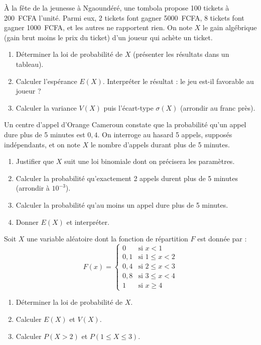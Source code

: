 \documentclass[11pt]{article}
\begin{document}
\begin{exercice}
À la fête de la jeunesse à Ngaoundéré, une tombola propose 100 tickets à \SI{200}{FCFA} l'unité. Parmi eux, 2 tickets font gagner \SI{5000}{FCFA}, 8 tickets font gagner \SI{1000}{FCFA}, et les autres ne rapportent rien. On note $X$ le gain algébrique (gain brut moins le prix du ticket) d'un joueur qui achète un ticket.
\begin{enumerate}
\item Déterminer la loi de probabilité de $X$ (présenter les résultats dans un tableau).
\item Calculer l'espérance $E(X)$. Interpréter le résultat : le jeu est-il favorable au joueur ?
\item Calculer la variance $V(X)$ puis l'écart-type $\sigma(X)$ (arrondir au franc près).
\end{enumerate}
\end{exercice}

\begin{exercice}
Un centre d'appel d'Orange Cameroun constate que la probabilité qu'un appel dure plus de 5 minutes est $0{,}4$. On interroge au hasard 5 appels, supposés indépendants, et on note $X$ le nombre d'appels durant plus de 5 minutes.
\begin{enumerate}
\item Justifier que $X$ suit une loi binomiale dont on précisera les paramètres.
\item Calculer la probabilité qu'exactement 2 appels durent plus de 5 minutes (arrondir à $10^{-3}$).
\item Calculer la probabilité qu'au moins un appel dure plus de 5 minutes.
\item Donner $E(X)$ et interpréter.
\end{enumerate}
\end{exercice}

\begin{exercice}
Soit $X$ une variable aléatoire dont la fonction de répartition $F$ est donnée par :
\[
F(x)=
\begin{cases}
0 & \text{si } x<1\\
0{,}1 & \text{si } 1\le x<2\\
0{,}4 & \text{si } 2\le x<3\\
0{,}8 & \text{si } 3\le x<4\\
1 & \text{si } x\ge 4
\end{cases}
\]
\begin{enumerate}
\item Déterminer la loi de probabilité de $X$.
\item Calculer $E(X)$ et $V(X)$.
\item Calculer $P(X>2)$ et $P(1\le X\le 3)$.
\end{enumerate}
\end{exercice}
\end{document}
